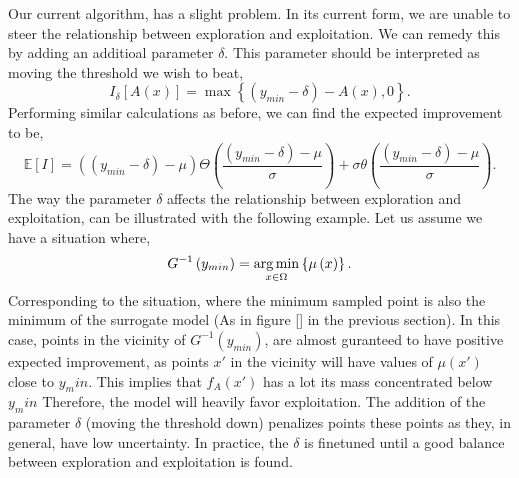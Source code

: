 Our current algorithm, has a slight problem. In its current form, we are unable to steer the relationship between exploration and exploitation. We can remedy this by adding an additioal parameter $\delta$. This parameter should be interpreted as moving the threshold we wish to beat,
\[
    I_{\delta} [A\left( x \right) ] = \max\left\{ \left( y_{min} - \delta \right) - A\left( x \right) , 0  \right\} 
.\] 
Performing similar calculations as before, we can find the expected improvement to be,
\[
\mathbb{E}\left[ I \right] = \left( \left(y_{min} - \delta\right) - \mu  \right) \Theta\left(\frac{\left(y_{min} - \delta\right) - \mu }{\sigma} \right) + \sigma \theta \left( \frac{\left(y_{min} - \delta\right) - \mu }{\sigma} \right) 
.\] 
The way the parameter $\delta$ affects the relationship between exploration and exploitation, can be illustrated with the following example. Let us assume we have a situation where,
\[
    G^{-1}\left(y_{min}\right) = \operatorname*{arg\,min}_{x \in \Omega}\left\{ \mu \left( x \right)  \right\}
.\] 
Corresponding to the situation, where the minimum sampled point is also the minimum of the surrogate model (As in figure [] in the previous section). In this case, points in the vicinity of $G^{-1}\left( y_{min} \right) $, are almost guranteed to have positive expected improvement, as points $x'$ in the vicinity will have values of $\mu \left( x' \right) $ close to $y_min$. This implies that $f_A\left( x' \right) $ has a lot its mass concentrated below $y_min$ Therefore, the model will heavily favor exploitation. The addition of the parameter $\delta$ (moving the threshold down) penalizes points these points as they, in general, have low uncertainty. In practice, the $\delta$ is finetuned until a good balance between exploration and exploitation is found.
%
